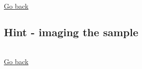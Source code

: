 \documentclass[a4paper]{report}
\begin{document}
	
	
	    
	\\
    \hyperlink{hintBack-illumination}{Go back}
    
    \clearpage
    
    \subsection{Hint - imaging the sample}
	\hypertarget{hintTo-imaging}{}
	
	
    \\
    \hyperlink{hintBack-imaging}{Go back}
    
    \clearpage
    
    
    
\end{document}
